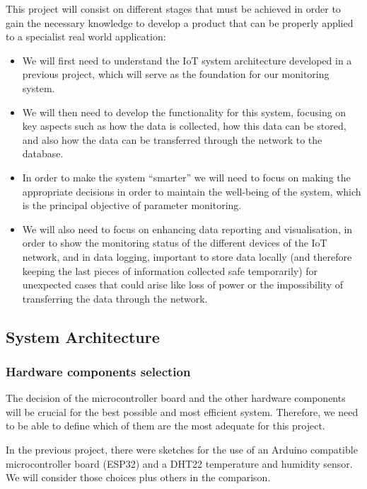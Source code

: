 \documentclass[12pt]{article}
\begin{document}
This project will consist on different stages that must be achieved in order to gain the necessary knowledge to develop a product that can be properly applied to a specialist real world application: 
\begin{itemize}
    \item We will first need to understand the IoT system architecture developed in a previous project, which will serve as the foundation for our monitoring system.
    \item We will then need to develop the functionality for this system, focusing on key aspects such as how the data is collected, how this data can be stored, and also how the data can be transferred through the network to the database.
    \item In order to make the system ``smarter'' we will need to focus on making the appropriate decisions in order to maintain the well-being of the system, which is the principal objective of parameter monitoring.
    \item We will also need to focus on enhancing data reporting and visualisation, in order to show the monitoring status of the different devices of the IoT network, and in data logging, important to store data locally (and therefore keeping the last pieces of information collected safe temporarily) for unexpected cases that could arise like loss of power or the impossibility of transferring the data through the network.
\end{itemize}   

\subsection{System Architecture}

\subsubsection{Hardware components selection}

The decision of the microcontroller board and the other hardware components will be crucial for the best possible and most efficient system. Therefore, we need to be able to define which of them are the most adequate for this project.\par

In the previous project, there were sketches for the use of an Arduino compatible microcontroller board (ESP32) and a DHT22 temperature and humidity sensor. We will consider those choices plus others in the comparison.\par
\end{document}
